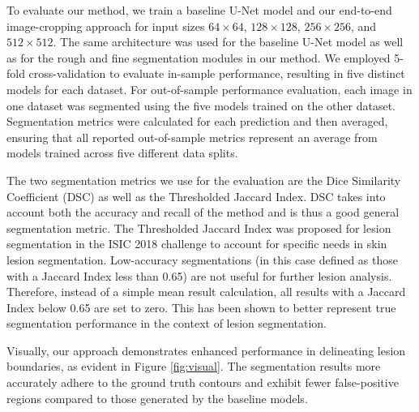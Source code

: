To evaluate our method, we train a baseline U-Net model and our end-to-end image-cropping approach for input sizes $64 \times 64$, $128 \times 128$, $256 \times 256$, and $512 \times 512$. The same architecture was used for the baseline U-Net model as well as for the rough and fine segmentation modules in our method. We employed 5-fold cross-validation to evaluate in-sample performance, resulting in five distinct models for each dataset. For out-of-sample performance evaluation, each image in one dataset was segmented using the five models trained on the other dataset. Segmentation metrics were calculated for each prediction and then averaged, ensuring that all reported out-of-sample metrics represent an average from models trained across five different data splits.

The two segmentation metrics we use for the evaluation are the Dice Similarity Coefficient (DSC) as well as the Thresholded Jaccard Index. DSC takes into account both the accuracy and recall of the method and is thus a good general segmentation metric. The Thresholded Jaccard Index was proposed for lesion segmentation in the ISIC 2018 challenge \cite{codellaSkinLesionAnalysis2018} to account for specific needs in skin lesion segmentation. Low-accuracy segmentations (in this case defined as those with a Jaccard Index less than 0.65) are not useful for further lesion analysis. Therefore, instead of a simple mean result calculation, all results with a Jaccard Index below 0.65 are set to zero. This has been shown to better represent true segmentation performance in the context of lesion segmentation. 

Visually, our approach demonstrates enhanced performance in delineating lesion boundaries, as evident in Figure \ref{fig:visual}. The segmentation results more accurately adhere to the ground truth contours and exhibit fewer false-positive regions compared to those generated by the baseline models.

